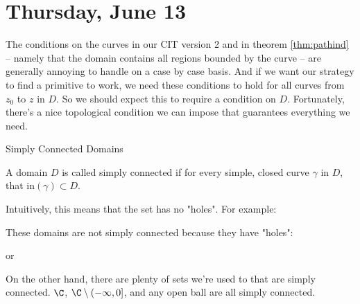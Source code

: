 \section{Thursday, June 13}


The conditions on the curves in our CIT version 2 and in theorem \ref{thm:pathind} -- namely that the domain contains all regions bounded by the curve -- are generally annoying to handle on a case by case basis. And if we want our strategy to find a primitive to work, we need these conditions to hold for all curves from $z_0$ to $z$ in $D$. So we should expect this to require a condition on $D$. Fortunately, there's a nice topological condition we can impose that guarantees everything we need.

\begin{defbo}{Simply Connected Domains}{}

A domain $D$ is called simply connected if for every simple, closed curve $\gamma$ in $D$, that $\mathrm{in}(\gamma) \subset D$.

\end{defbo}

Intuitively, this means that the set has no "holes". For example:

\begin{ex}{}{} These domains are not simply connected because they have "holes":

\begin{center}
\qquad or \qquad
{}

\end{center}

On the other hand, there are plenty of sets we're used to that are simply connected. $\C$, $\C\setminus (-\infty,0]$, and any open ball are all simply connected.
\end{ex}

